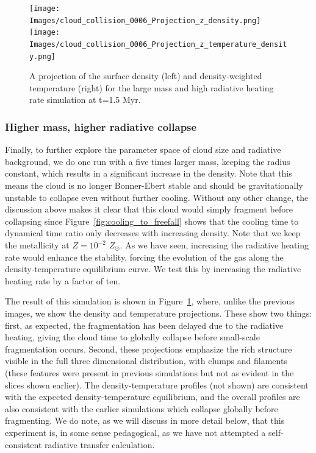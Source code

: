 \documentclass[useAMS,usenatbib]{mn2e}
\begin{document}
\begin{figure}
\begin{center}
\texttt{[image: Images/cloud\_collision\_0006\_Projection\_z\_density.png]}
\texttt{[image: Images/cloud\_collision\_0006\_Projection\_z\_temperature\_density.png]}
\end{center}
\caption{\label{fig:big_projections} A projection of the surface density (left) and density-weighted temperature (right)
for the large mass and high radiative heating rate simulation at t=1.5 Myr.}
\end{figure}

\subsubsection{Higher mass, higher radiative collapse}

Finally, to further explore the parameter space of cloud size and radiative background, we do one run with a five times larger mass,
keeping the radius constant, which results in a significant increase in the density.  Note that this means the cloud is no longer Bonner-Ebert
stable and should be gravitationally unstable to collapse even without further cooling.  Without any other change, the discussion above
makes it clear that this cloud would simply fragment before collapsing since Figure~\ref{fig:cooling_to_freefall} shows that the cooling
time to dynamical time ratio only decreases with increasing density.  Note that we keep the metallicity at $Z=10^{-2}$ $Z_{\odot}$. As we have seen, increasing the radiative heating rate would enhance the stability, forcing the evolution of the gas along the
density-temperature equilibrium curve. We test this by increasing the radiative heating rate by a factor of ten.

The result of this simulation is shown in Figure~\ref{fig:big_projections}, where, unlike the previous images, we show the density and temperature projections.
These show two things: first, as expected, the fragmentation has been delayed due to the radiative heating, giving the cloud time to globally collapse before
small-scale fragmentation occurs.  Second, these projections emphasize the rich structure visible in the full three dimensional distribution,
with clumps and filaments (these features were present in previous simulations but not as evident in the slices shown earlier). The density-temperature
profiles (not shown) are consistent with the expected density-temperature equilibrium, and the overall profiles are also consistent with the earlier simulations
which collapse globally before fragmenting.  We do note, as we will discuss in more detail below, that this experiment is, in some sense pedagogical, as we
have not attempted a self-consistent radiative transfer calculation.
\end{document}
